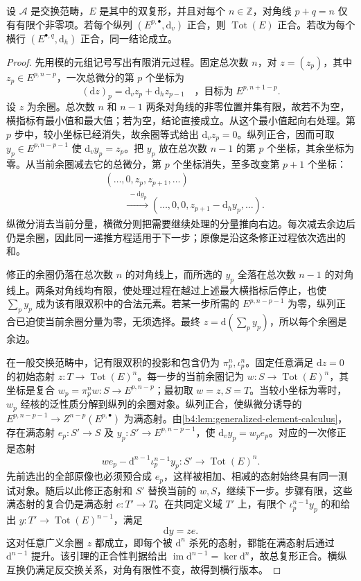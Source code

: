 \begin{lemma}[有限对角双复形的消元]\label{b4:lem:bounded-double-complex}
	设 \(\mathcal A\) 是交换范畴，\(E\) 是其中的双复形，并且对每个 \(n\in\mathbb Z\)，对角线 \(p+q=n\) 仅有有限个非零项。若每个纵列 \((E^{p,\bullet},\mathrm{d}_v)\) 正合，则 \(\operatorname{Tot}(E)\) 正合。若改为每个横行 \((E^{\bullet,q},\mathrm{d}_h)\) 正合，同一结论成立。
\end{lemma}
\begin{proof}
	先用模的元组记号写出有限消元过程。固定总次数 \(n\)，对 \(z=(z_p)\)，其中 \(z_p\in E^{p,n-p}\)，一次总微分的第 \(p\) 个坐标为
	\[
		(\mathrm{d}z)_p=\mathrm{d}_vz_p+\mathrm{d}_hz_{p-1} \quad\text{，目标为}\;E^{p,n+1-p}.
	\]
	设 \(z\) 为余圈。总次数 \(n\) 和 \(n-1\) 两条对角线的非零位置并集有限，故若不为空，横指标有最小值和最大值；若为空，结论直接成立。从这个最小值起向右处理。第 \(p\) 步中，较小坐标已经消失，故余圈等式给出 \(\mathrm{d}_vz_p=0\)。纵列正合，因而可取 \(y_p\in E^{p,n-p-1}\) 使 \(\mathrm{d}_vy_p=z_p\)。把 \(y_p\) 放在总次数 \(n-1\) 的第 \(p\) 个坐标，其余坐标为零。从当前余圈减去它的总微分，第 \(p\) 个坐标消失，至多改变第 \(p+1\) 个坐标：
	\[
		\begin{aligned}
			&(\ldots,0,z_p,z_{p+1},\ldots)\\
			&\qquad\xrightarrow{\ -\mathrm{d}y_p\ } (\ldots,0,0,z_{p+1}-\mathrm{d}_hy_p,\ldots).
		\end{aligned}
	\]
	纵微分消去当前分量，横微分则把需要继续处理的分量推向右边。每次减去余边后仍是余圈，因此同一递推方程适用于下一步；原像是沿这条修正过程依次选出的和。

	修正的余圈仍落在总次数 \(n\) 的对角线上，而所选的 \(y_p\) 全落在总次数 \(n-1\) 的对角线上。两条对角线均有限，使处理过程在越过上述最大横指标后停止，也使 \(\sum_p y_p\) 成为该有限双积中的合法元素。若某一步所需的 \(E^{p,n-p-1}\) 为零，纵列正合已迫使当前余圈分量为零，无须选择。最终 \(z=\mathrm{d}(\sum_p y_p)\)，所以每个余圈是余边。

	在一般交换范畴中，记有限双积的投影和包含仍为 \(\pi_p^n,\iota_p^n\)。固定任意满足 \(\mathrm{d}z=0\) 的初始态射 \(z:T\to\operatorname{Tot}(E)^n\)。每一步的当前余圈记为 \(w:S\to\operatorname{Tot}(E)^n\)，其坐标是复合 \(w_p=\pi_p^nw:S\to E^{p,n-p}\)；最初取 \(w=z,S=T\)。当较小坐标为零时，\(w_p\) 经核的泛性质分解到纵列的余圈对象。纵列正合，使纵微分诱导的 \(E^{p,n-p-1}\to Z^{n-p}(E^{p,\bullet})\) 为满态射。由\cref{b4:lem:generalized-element-calculus}，存在满态射 \(e_p:S'\to S\) 及 \(y_p:S'\to E^{p,n-p-1}\)，使 \(\mathrm{d}_vy_p=w_pe_p\)。对应的一次修正是态射
	\[
		we_p-\mathrm{d}^{n-1}\iota_p^{n-1}y_p: S'\longrightarrow\operatorname{Tot}(E)^n.
	\]
	先前选出的全部原像也必须预合成 \(e_p\)，这样被相加、相减的态射始终具有同一测试对象。随后以此修正态射和 \(S'\) 替换当前的 \(w,S\)，继续下一步。步骤有限，这些满态射的复合仍是满态射 \(e:T'\to T\)。在共同定义域 \(T'\) 上，有限个 \(\iota_p^{n-1}y_p\) 的和给出 \(y:T'\to\operatorname{Tot}(E)^{n-1}\)，满足
	\[
		\mathrm dy=ze.
	\]
	这对任意广义余圈 \(z\) 都成立，即每个被 \(\mathrm{d}^n\) 杀死的态射，都能在满态射后通过 \(\mathrm{d}^{n-1}\) 提升。该引理的正合性判据给出 \(\operatorname{im}\mathrm{d}^{n-1}=\ker\mathrm{d}^n\)，故总复形正合。横纵互换仍满足反交换关系，对角有限性不变，故得到横行版本。
\end{proof}


